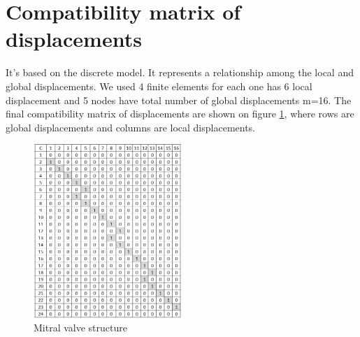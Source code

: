 \section*{Compatibility matrix of displacements}
It's based on the discrete model. It represents a relationship among the local
and global displacements. We used 4 finite elements for each one has 6 local
displacement and 5 nodes have total number of global displacements m=16. The
final compatibility matrix of displacements are shown on figure
\ref{fig:CDmatrix}, where rows are global displacements and columns are local
displacements.
\begin{figure}[H]
  \centering
  \includegraphics[width=0.5\textwidth]{./fig/CDmatrix.png}
    \caption{Mitral valve structure}
    \label{fig:CDmatrix}
\end{figure}
